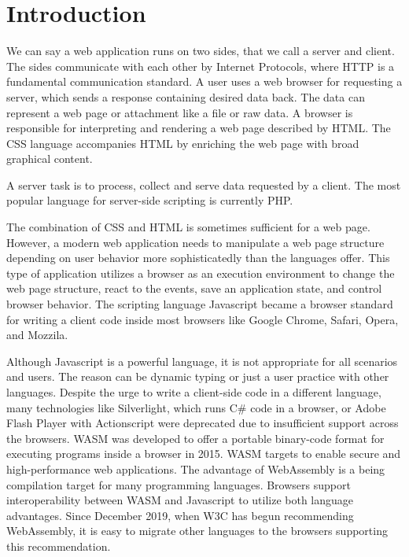 \chapter*{Introduction}

We can say a web application runs on two sides, that we call a server and client.
The sides communicate with each other by Internet Protocols, where
\ac{HTTP} is a fundamental communication standard.
A user uses a web browser for requesting a server, which sends a response containing desired data back.
The data can represent a web page or attachment like a file or raw data.
A browser is responsible for interpreting and rendering a web page described by \ac{HTML}.
The \ac{CSS} language accompanies HTML by enriching the web page with broad graphical content. 
\par
A server task is to process, collect and serve data requested by a client.
The most popular language for server-side scripting is currently PHP. 
\par
The combination of CSS and HTML is sometimes sufficient for a web page.
However, a modern web application needs to manipulate a web page structure depending on user behavior more sophisticatedly than the languages offer.
This type of application utilizes a browser as an execution environment to change the web page structure, react to the events, save an application state, and control browser behavior. 
The scripting language Javascript became a browser standard for writing a client code inside most browsers like Google Chrome, Safari, Opera, and Mozzila.
\par
Although Javascript is a powerful language, it is not appropriate for all scenarios and users.
The reason can be dynamic typing or just a user practice with other languages.
Despite the urge to write a client-side code in a different language, many technologies like Silverlight, which runs C\# code in a browser, or Adobe Flash Player with Actionscript were deprecated due to insufficient support across the browsers.
\ac{WASM} was developed to offer a portable binary-code format for executing programs inside a browser  in 2015.
WASM targets to enable secure and high-performance web applications.
The advantage of WebAssembly is a being compilation target for many programming languages.
Browsers support interoperability between WASM and Javascript to utilize both language advantages.
Since December 2019, when \ac{W3C} has begun recommending WebAssembly, it is easy to migrate other languages to the browsers supporting this recommendation.
